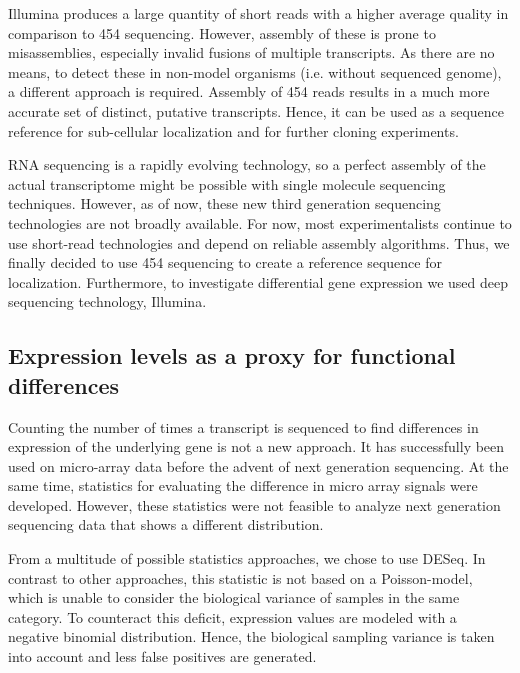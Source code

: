 		Illumina produces a large quantity of short reads with a higher average quality in comparison to 454 sequencing.
		However,  assembly of these is prone to misassemblies, especially invalid fusions of multiple transcripts.
		As there are no means, to detect these in non-model organisms (i.e. without sequenced genome), a different approach is required.
		Assembly of 454 reads results in a much more accurate set of distinct, putative transcripts.
		Hence, it can be used as a sequence reference for sub-cellular localization and for further cloning experiments.
		

		RNA sequencing is a rapidly evolving technology, so a perfect assembly of the actual transcriptome might be possible with single molecule sequencing techniques.
		However, as of now, these new third generation sequencing technologies are not broadly available.
		For now, most experimentalists continue to use short-read technologies and depend on reliable assembly algorithms.
		Thus, we finally decided to use 454 sequencing to create a reference sequence for  localization.
		Furthermore, to investigate differential gene expression we used deep sequencing technology, Illumina.
		
		\subsection{Expression levels as a proxy for functional differences}
		Counting the number of times a transcript is sequenced to find differences in expression of the underlying gene is not a new approach.
		It has successfully been used on micro-array data before the advent of next generation sequencing.
		At the same time, statistics for evaluating the difference in micro array signals were developed.
		However, these statistics were not feasible to analyze next generation sequencing data that shows a different distribution.
		
		From a multitude of possible statistics approaches, we chose to use DESeq.
		In contrast to other approaches, this statistic is not based on a Poisson-model, which is unable to consider the biological variance of samples in the same category.
		To counteract this deficit, expression values are modeled with a negative binomial distribution.
		Hence, the biological sampling variance is taken into account and less false positives are generated.

